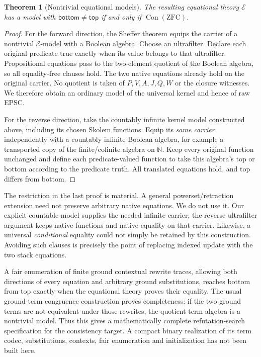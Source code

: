 \documentclass[11pt]{article}
\newtheorem{theorem}{Theorem}
\newcommand{\Con}{\operatorname{Con}}
\begin{document}
\begin{theorem}[Nontrivial equational models]
The resulting equational theory $\mathcal E$ has a model with
$\mathsf{bottom}\ne\mathsf{top}$ if and only if $\Con(\mathrm{ZFC})$.
\end{theorem}
\begin{proof}
For the forward direction, the Sheffer theorem equips the carrier of a nontrivial $\mathcal E$-model with a Boolean algebra. Choose an ultrafilter. Declare each original predicate true exactly when its value belongs to that ultrafilter. Propositional equations pass to the two-element quotient of the Boolean algebra, so all equality-free clauses hold. The two native equations already hold on the original carrier. No quotient is taken of $P,V,A,J,Q,W$ or the closure witnesses. We therefore obtain an ordinary model of the universal kernel and hence of raw EPSC.

For the reverse direction, take the countably infinite kernel model constructed above, including its chosen Skolem functions. Equip its \emph{same carrier} independently with a countably infinite Boolean algebra, for example a transported copy of the finite/cofinite algebra on $\mathbb N$. Keep every original function unchanged and define each predicate-valued function to take this algebra's top or bottom according to the predicate truth. All translated equations hold, and top differs from bottom.
\end{proof}

The restriction in the last proof is material. A general powerset/retraction extension need not preserve arbitrary native equations. We do not use it. Our explicit countable model supplies the needed infinite carrier; the reverse ultrafilter argument keeps native functions and native equality on that carrier. Likewise, a universal \emph{conditional} equality could not simply be retained by this construction. Avoiding such clauses is precisely the point of replacing indexed update with the two stack equations.

A fair enumeration of finite ground contextual rewrite traces, allowing both directions of every equation and arbitrary ground substitutions, reaches bottom from top exactly when the equational theory proves their equality. The usual ground-term congruence construction proves completeness: if the two ground terms are not equivalent under those rewrites, the quotient term algebra is a nontrivial model. Thus this gives a mathematically complete refutation-search specification for the consistency target. A compact binary realization of its term codec, substitutions, contexts, fair enumeration and initialization has not been built here.
\end{document}
